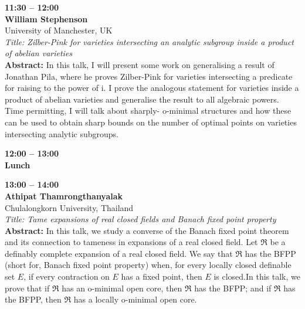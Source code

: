 \documentclass[10pt,a4paper]{article}
\begin{document}
\begin{tcolorbox}[talkbox]
\textbf{11:30 -- 12:00} \\
\textbf{William Stephenson} \\
University of Manchester, UK \\
\textit{Title: Zilber-Pink for varieties intersecting an analytic subgroup inside a product of abelian varieties} \\
\textbf{Abstract:} In this talk, I will present some work on generalising a result of Jonathan Pila, where he proves Zilber-Pink for varieties intersecting a predicate for raising to the power of i. I prove the analogous statement for varieties inside a product of abelian varieties and generalise the result to all algebraic powers. Time permitting, I will talk about sharply- o-minimal structures and how these can be used to obtain sharp bounds on the number of optimal points on varieties intersecting analytic subgroups.
\end{tcolorbox}
\begin{tcolorbox}[talkbox]
\textbf{12:00 -- 13:00} \\
\textbf{Lunch}
\end{tcolorbox}
\begin{tcolorbox}[talkbox]
\textbf{13:00 -- 14:00} \\
\textbf{Athipat Thamrongthanyalak} \\
Chulalongkorn University, Thailand \\
\textit{Title: Tame expansions of real closed fields and Banach fixed point property} \\
\textbf{Abstract:} In this talk, we study a converse of the Banach fixed point theorem and its connection to tameness in expansions of a real closed field. Let $\mathfrak R$ be a definably complete expansion of a real closed field. We say that $\mathfrak R$ has the BFPP (short for, Banach fixed point property) when, for every locally closed definable set $E$, if every contraction on $E$ has a fixed point, then $E$ is closed.In this talk, we prove that if $\mathfrak R$ has an o-minimal open core, then $\mathfrak R$ has the BFPP; and if $\mathfrak R$ has the BFPP, then $\mathfrak R$ has a locally o-minimal open core.
\end{tcolorbox}
\end{document}
